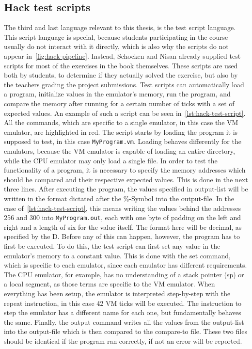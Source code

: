 \subsection{Hack test scripts} \label{test-scripts}
The third and last language relevant to this thesis, is the test script language.
This script language is special, because students participating in the course usually do not interact with it directly, which is also why the scripts do not appear in~\ref{fig:hack-pipeline}.
Instead, Schocken and Nisan already supplied test scripts for most of the exercises in the book themselves.
These scripts are used both by students, to determine if they actually solved the exercise, but also by the teachers grading the project submissions.
Test scripts can automatically load a program, initialize values in the emulator's memory, run the program, and compare the memory after running for a certain number of ticks with a set of expected values.
An example of such a script can be seen in~\cref{lst:hack-test-script}.
All the commands, which are specific to a single emulator, in this case the VM emulator, are highlighted in red.
The script starts by loading the program it is supposed to test, in this case \verb+MyProgram.vm+.
Loading behaves differently for the emulators, because the VM emulator is capable of loading an entire directory, while the CPU emulator may only load a single file.
In order to test the functionality of a program, it is necessary to specify the memory addresses which should be compared and their respective expected values.
This is done in the next three lines.
After executing the program, the values specified in output-list will be written in the format dictated after the \%-Symbol into the output-file.
In the case of~\cref{lst:hack-test-script}, this means writing the values behind the addresses 256 and 300 into \verb+MyProgram.out+, each with one byte of padding on the left and right and a length of six for the value itself.
The format here will be decimal, as specified by the D.
Before any of this can happen, however, the program has to first be executed.
To do this, the test script can first set any value in the emulator's memory to a constant value.
This is done with the set command, which is specific to each emulator, since each emulator has different requirements.
The CPU emulator, for example, has no understanding of a stack pointer (sp) or a local segment, as those terms are specific to the VM emulator.
When everything has been setup, the emulator is interpreted step-by-step with the repeat instruction, in this case 42 VM ticks will be executed.
The instruction to step the emulator has a different name for each one, but fundamentally behaves the same.
Finally, the output command writes all the values from the output-list into the output-file which is then compared to the compare-to file.
These two files should be identical if the program ran correctly, if not an error will be reported.


